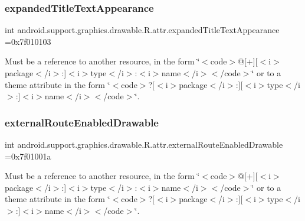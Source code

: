 \subsubsection{\texorpdfstring{expanded\+Title\+Text\+Appearance}{expandedTitleTextAppearance}}
{\footnotesize\ttfamily int android.\+support.\+graphics.\+drawable.\+R.\+attr.\+expanded\+Title\+Text\+Appearance =0x7f010103\hspace{0.3cm}{\ttfamily [static]}}

Must be a reference to another resource, in the form \char`\"{}$<$code$>$@\mbox{[}+\mbox{]}\mbox{[}$<$i$>$package$<$/i$>$\+:\mbox{]}$<$i$>$type$<$/i$>$\+:$<$i$>$name$<$/i$>$$<$/code$>$\char`\"{} or to a theme attribute in the form \char`\"{}$<$code$>$?\mbox{[}$<$i$>$package$<$/i$>$\+:\mbox{]}\mbox{[}$<$i$>$type$<$/i$>$\+:\mbox{]}$<$i$>$name$<$/i$>$$<$/code$>$\char`\"{}. \mbox{\label{classandroid_1_1support_1_1graphics_1_1drawable_1_1R_1_1attr_a97e1c334c47151e6c3cb732ec5d6df90}} 
\subsubsection{\texorpdfstring{external\+Route\+Enabled\+Drawable}{externalRouteEnabledDrawable}}
{\footnotesize\ttfamily int android.\+support.\+graphics.\+drawable.\+R.\+attr.\+external\+Route\+Enabled\+Drawable =0x7f01001a\hspace{0.3cm}{\ttfamily [static]}}

Must be a reference to another resource, in the form \char`\"{}$<$code$>$@\mbox{[}+\mbox{]}\mbox{[}$<$i$>$package$<$/i$>$\+:\mbox{]}$<$i$>$type$<$/i$>$\+:$<$i$>$name$<$/i$>$$<$/code$>$\char`\"{} or to a theme attribute in the form \char`\"{}$<$code$>$?\mbox{[}$<$i$>$package$<$/i$>$\+:\mbox{]}\mbox{[}$<$i$>$type$<$/i$>$\+:\mbox{]}$<$i$>$name$<$/i$>$$<$/code$>$\char`\"{}. \mbox{\label{classandroid_1_1support_1_1graphics_1_1drawable_1_1R_1_1attr_a67b102360575ba55657da14ea8cd493f}} 
